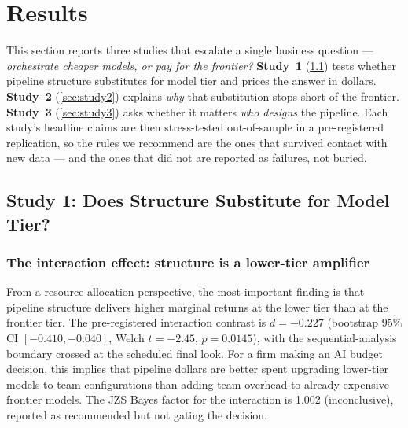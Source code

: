 \documentclass[12pt,a4paper]{article}
\begin{document}
\section{Results}\label{sec:results}

This section reports three studies that escalate a single business question ---
\emph{orchestrate cheaper models, or pay for the frontier?} \textbf{Study~1}
(\cref{sec:study1}) tests whether pipeline structure substitutes for model tier
and prices the answer in dollars. \textbf{Study~2} (\cref{sec:study2}) explains
\emph{why} that substitution stops short of the frontier. \textbf{Study~3}
(\cref{sec:study3}) asks whether it matters \emph{who designs} the pipeline.
Each study's headline claims are then stress-tested out-of-sample in a
pre-registered replication, so the rules we recommend are the ones that survived
contact with new data --- and the ones that did not are reported as failures,
not buried.

\subsection{Study 1: Does Structure Substitute for Model Tier?}\label{sec:study1}

\subsubsection{The interaction effect: structure is a lower-tier
amplifier}\label{sec:interaction}

From a resource-allocation perspective, the most important finding is that
pipeline structure delivers higher marginal returns at the lower tier than at
the frontier tier. The pre-registered interaction contrast is $d = -0.227$
(bootstrap 95\% CI $[-0.410, -0.040]$, Welch $t = -2.45$, $p = 0.0145$), with
the sequential-analysis boundary crossed at the scheduled final look. For a
firm making an AI budget decision, this implies that pipeline dollars are better
spent upgrading lower-tier models to team configurations than adding team overhead to
already-expensive frontier models. The JZS Bayes factor for the interaction is
1.002 (inconclusive), reported as recommended but not gating the decision.
\end{document}
